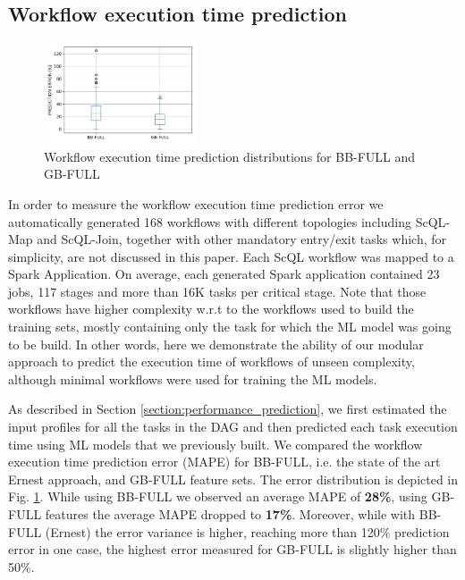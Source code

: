\documentclass[a4paper, 10pt, conference]{ieeeconf}      %
\begin{document}
\subsection{Workflow execution time prediction}
\label{subsec:results-workflow}
\begin{figure}
  \centering
  \includegraphics[width=0.4\textwidth]{sources/wexec.png}
  \caption{Workflow execution time prediction distributions for BB-FULL and GB-FULL}
  \label{fig:workex-boxolot}
\end{figure}
In order to measure the workflow execution time prediction error we automatically generated 168 workflows  with different topologies including ScQL-Map and ScQL-Join, together with other mandatory entry/exit tasks which, for simplicity, are not discussed in this paper.  \color{black}Each ScQL workflow was mapped to a Spark Application. On average, each generated Spark application contained 23 jobs, 117 stages and more than 16K tasks per critical stage. \color{black}
Note that those workflows have higher complexity w.r.t to the workflows used to build the training sets, mostly containing only the task for which the ML model was going to be build.
In other words, here we demonstrate the ability of our modular approach to predict the execution time of workflows of unseen complexity, although minimal workflows were used for training the ML models.

As described in Section \ref{section:performance_prediction}, we first estimated the input profiles for all the tasks in the DAG and then predicted each task execution time using ML models that we previously built.
We compared the workflow execution time prediction error (MAPE) for BB-FULL, i.e. the state of the art Ernest approach, and GB-FULL feature sets. The error distribution is depicted in Fig. \ref{fig:workex-boxolot}. While using BB-FULL we observed an average MAPE of \textbf{28\%}, using GB-FULL features the average MAPE dropped to \textbf{17\%}.   Moreover, while with BB-FULL (Ernest)  the error variance is higher, reaching more than 120\% prediction error in one case, the highest error measured for GB-FULL is slightly higher than 50\%.

\end{document}
